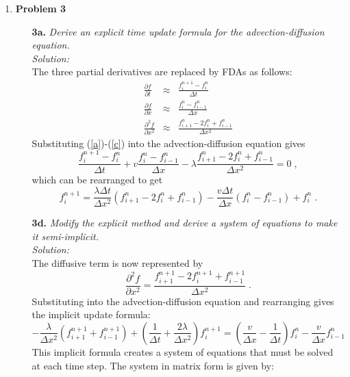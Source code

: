 \documentclass[12pt,letterpaper]{article}
\begin{document}
\begin{enumerate}
\item \textbf{Problem 3}
\begin{itemize}
\item[\textbf{3a.}] \textit{Derive an explicit time update formula for the advection-diffusion equation.}\\
\textit{Solution:}\\
The three partial derivatives are replaced by FDAs as follows:
\begin{eqnarray}
\label{a}
\frac{\partial f}{\partial t} &\approx & \frac{f_i^{n+1} - f_i^n}{\Delta t}\\
\frac{\partial f}{\partial x} &\approx & \frac{f_i^n - f_{i-1}^n}{\Delta x}\\
\frac{\partial ^2 f}{\partial x^2} &\approx & \frac{f^n_{i+1} - 2f_i^n + f_{i-1}^n}{\Delta x^2}
\label{c}
\end{eqnarray}
Substituting (\ref{a})-(\ref{c}) into the advection-diffusion equation gives
\begin{equation*}
\frac{f_i^{n+1} - f_i^n}{\Delta t} + v \frac{f_i^n - f_{i-1}^n}{\Delta x} - \lambda \frac{f^n_{i+1} - 2f_i^n + f_{i-1}^n}{\Delta x^2} = 0\;,
\end{equation*}
which can be rearranged to get
\begin{equation}
f_i^{n+1} = \frac{\lambda \Delta t}{\Delta x^2} \left( f^n_{i+1} - 2f_i^n + f_{i-1}^n \right) - \frac{v \Delta t}{\Delta x} \left( f_i^n - f_{i-1}^n \right) + f_i^n\;.
\end{equation}
\item[\textbf{3d.}] \textit{Modify the explicit method and derive a system of equations to make it semi-implicit.}\\
\textit{Solution:}\\
The diffusive term is now represented by
\begin{equation}
\frac{\partial ^2f}{\partial x^2} = \frac{f_{i+1}^{n+1} - 2f_{i}^{n+1} + f_{i-1}^{n+1}}{\Delta x^2}\;.
\end{equation}
Substituting into the advection-diffusion equation and rearranging gives the implicit update formula:
\begin{equation}
-\frac{\lambda}{\Delta x^2}\left( f_{i+1}^{n+1} + f_{i-1}^{n+1}\right) + \left(\frac{1}{\Delta t} + \frac{2\lambda}{\Delta x^2} \right)f_{i}^{n+1} = \left(\frac{v}{\Delta x} - \frac{1}{\Delta t} \right)f_i^n - \frac{v}{\Delta x}f_{i-1}^n
\end{equation}
This implicit formula creates a system of equations that must be solved at each time step. The system in matrix form is given by:


\end{itemize}
\end{enumerate}
\end{document}
